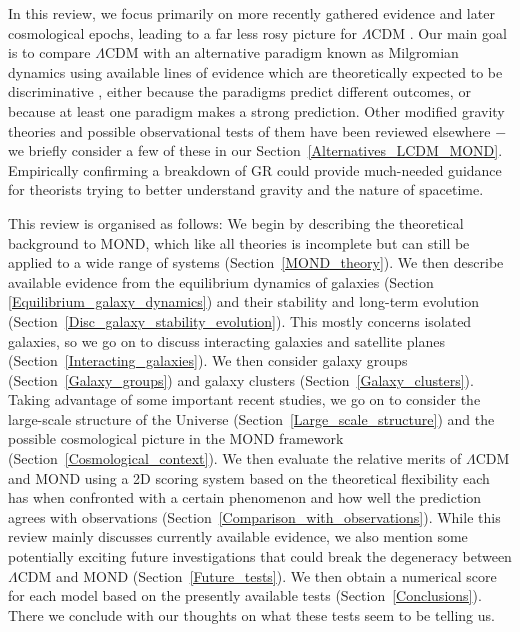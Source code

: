 \documentclass[fleqn,usenatbib,useAMS]{mnras} %
\begin{document}
In this review, we focus primarily on more recently gathered evidence and later cosmological epochs, leading to a far less rosy picture for $\Lambda$CDM \citep[serious problems with it are reviewed in][]{Kroupa_2010, Kroupa_2012, Kroupa_2015}. Our main goal is to compare $\Lambda$CDM with an alternative paradigm known as Milgromian dynamics \citep[MOND;][]{Milgrom_1983} using available lines of evidence which are theoretically expected to be discriminative \citep{Milgrom_1983_galaxies, Milgrom_1983_groups}, either because the paradigms predict different outcomes, or because at least one paradigm makes a strong prediction. Other modified gravity theories and possible observational tests of them have been reviewed elsewhere \citep[e.g.][]{Baker_2021} $-$ we briefly consider a few of these in our Section~\ref{Alternatives_LCDM_MOND}. Empirically confirming a breakdown of GR could provide much-needed guidance for theorists trying to better understand gravity and the nature of spacetime.

This review is organised as follows: We begin by describing the theoretical background to MOND, which like all theories is incomplete but can still be applied to a wide range of systems (Section~\ref{MOND_theory}). We then describe available evidence from the equilibrium dynamics of galaxies (Section \ref{Equilibrium_galaxy_dynamics}) and their stability and long-term evolution (Section~\ref{Disc_galaxy_stability_evolution}). This mostly concerns isolated galaxies, so we go on to discuss interacting galaxies and satellite planes (Section~\ref{Interacting_galaxies}). We then consider galaxy groups (Section~\ref{Galaxy_groups}) and galaxy clusters (Section~\ref{Galaxy_clusters}). Taking advantage of some important recent studies, we go on to consider the large-scale structure of the Universe (Section~\ref{Large_scale_structure}) and the possible cosmological picture in the MOND framework (Section~\ref{Cosmological_context}). We then evaluate the relative merits of $\Lambda$CDM and MOND using a 2D scoring system based on the theoretical flexibility each has when confronted with a certain phenomenon and how well the prediction agrees with observations (Section~\ref{Comparison_with_observations}). While this review mainly discusses currently available evidence, we also mention some potentially exciting future investigations that could break the degeneracy between $\Lambda$CDM and MOND (Section~\ref{Future_tests}). We then obtain a numerical score for each model based on the presently available tests (Section~\ref{Conclusions}). There we conclude with our thoughts on what these tests seem to be telling us.
\end{document}
